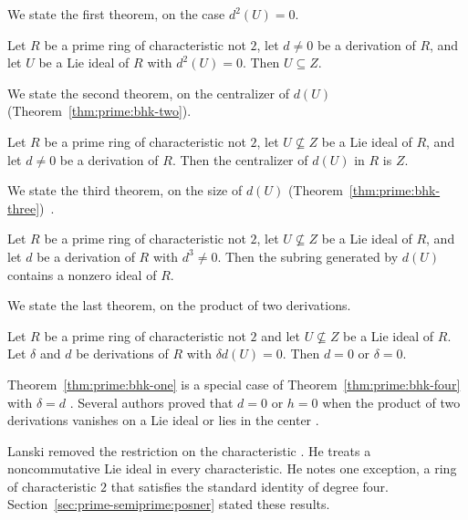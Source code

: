 We state the first theorem, on the case $d^2(U)=0$.

\begin{theorem}\label{thm:prime:bhk-one}
Let $R$ be a prime ring of characteristic not $2$, let $d\neq 0$ be a derivation
of $R$, and let $U$ be a Lie ideal of $R$ with $d^2(U)=0$. Then $U\subseteq Z$.
\end{theorem}

We state the second theorem, on the centralizer of $d(U)$
(Theorem~\ref{thm:prime:bhk-two}).

\begin{theorem}\label{thm:prime:bhk-two}
Let $R$ be a prime ring of characteristic not $2$, let $U\not\subseteq Z$ be a Lie
ideal of $R$, and let $d\neq 0$ be a derivation of $R$. Then the centralizer of
$d(U)$ in $R$ is $Z$.
\end{theorem}

We state the third theorem, on the size of $d(U)$ (Theorem~\ref{thm:prime:bhk-three})~\cite[Theorem~3, p.~265]{BergenHersteinKerr1981}.
\begin{theorem}\label{thm:prime:bhk-three}
Let $R$ be a prime ring of characteristic not $2$, let $U\not\subseteq Z$ be a Lie
ideal of $R$, and let $d$ be a derivation of $R$ with $d^3\neq 0$. Then the
subring generated by $d(U)$ contains a nonzero ideal of $R$.
\end{theorem}

We state the last theorem, on the product of two derivations.

\begin{theorem}\label{thm:prime:bhk-four}
Let $R$ be a prime ring of characteristic not $2$ and let $U\not\subseteq Z$ be a
Lie ideal of $R$. Let $\delta$ and $d$ be derivations of $R$ with
$\delta d(U)=0$. Then $d=0$ or $\delta=0$.
\end{theorem}

Theorem~\ref{thm:prime:bhk-one} is a special case of
Theorem~\ref{thm:prime:bhk-four} with $\delta=d$
\cite[p.~266]{BergenHersteinKerr1981}. Several authors proved that $d=0$ or
$h=0$ when the product of two derivations vanishes on a Lie ideal or lies in
the center \cite[p.~275]{Lanski1988}.

Lanski removed the restriction on the characteristic
\cite[p.~276]{Lanski1988}. He treats a noncommutative Lie ideal in every
characteristic. He notes one exception, a ring of characteristic $2$ that
satisfies the standard identity of degree four.
Section~\ref{sec:prime-semiprime:posner} stated these results.

